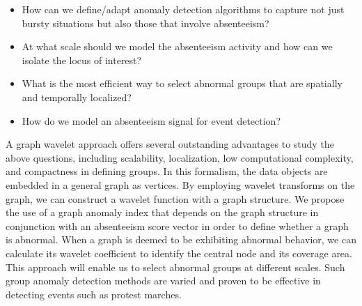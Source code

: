 \documentclass[twoside,leqno,twocolumn]{article}
\begin{document}
\begin{itemize}
\item How can we define/adapt anomaly detection algorithms to capture not just bursty situations
but also those that involve absenteeism?
\item At what scale should we model the absenteeism activity and how can we isolate the locus of
interest?
\item What is the most efficient way to select abnormal groups that are spatially and temporally localized?
\item How do we model an absenteeism signal for event detection?
\end{itemize}

A graph wavelet approach offers several outstanding advantages to study the above questions, including scalability, localization, low computational complexity, and
compactness in defining groups. In this formalism, the data objects are embedded in a general graph as vertices. By employing wavelet transforms on the graph, we can construct a wavelet function with a graph structure. We propose the use of a graph anomaly index that depends on the graph structure in conjunction with an absenteeism score vector in order to define whether a graph is abnormal. When a graph is deemed to be exhibiting abnormal behavior, we can calculate its wavelet coefficient to identify the central node and its coverage area. This approach will enable us to select abnormal groups at different scales. Such group anomaly detection methods are varied and proven to be effective in detecting events such as protest marches.

\end{document}
